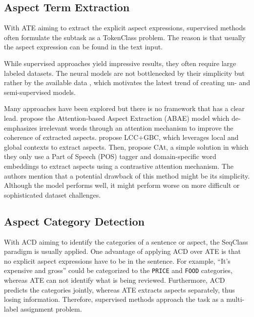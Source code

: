\documentclass[american, oneside]{ecsgdp}
\begin{document}
\subsection{Aspect Term Extraction} \label{sec:ATE}
With ATE aiming to extract the explicit aspect expressions, supervised methods often formulate the subtask as a TokenClass problem. The reason is that usually the aspect expression can be found in the text input.

While supervised approaches yield impressive results, they often require large labeled datasets. The neural models are not bottlenecked by their simplicity but rather by the available data \parencite{Huang2020JASen}, which motivates the latest trend of creating un- and semi-supervised models.  

Many approaches have been explored but there is no framework that has a clear lead. \textcite{He2017ABAE} propose the Attention-based Aspect Extraction (ABAE) model which de-emphasizes irrelevant words through an attention mechanism to improve the coherence of extracted aspects. \textcite{Liao2019LCC+GBC} propose LCC+GBC, which leverages local and global contexts to extract aspects. Then, \textcite{Tulkens2020CAt} propose CAt, a simple solution in which they only use a Part of Speech (POS) tagger and domain-specific word embeddings to extract aspects using a contrastive attention mechanism. The authors mention that a potential drawback of this method might be its simplicity. Although the model performs well, it might perform worse on more difficult or sophisticated dataset challenges. 


\subsection{Aspect Category Detection} \label{sec:ACD}
With ACD aiming to identify the categories of a sentence or aspect, the SeqClass paradigm is usually applied. One advantage of applying ACD over ATE is that no explicit aspect expressions have to be in the sentence. For example, ``It's expensive and gross'' could be categorized to the \texttt{PRICE} and \texttt{FOOD} categories, whereas ATE can not identify what is being reviewed. Furthermore, ACD predicts the categories jointly, whereas ATE extracts aspects separately, thus losing information. Therefore, supervised methods approach the task as a multi-label assignment problem. 
\end{document}
